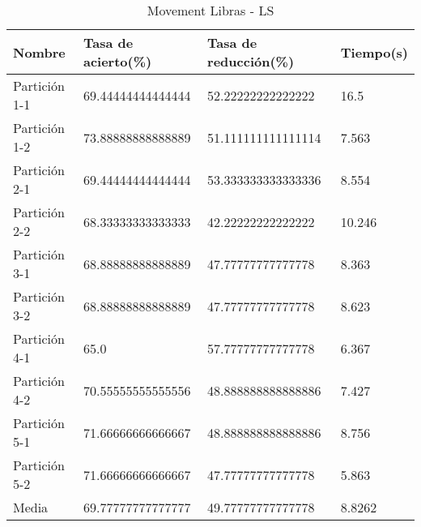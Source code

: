 \begin{table}[H]
	\centering
	\begin{tabular}{l|lll}
		Nombre        & Tasa de acierto(\%) & Tasa de reducción(\%) & Tiempo(s) \\ \hline
		Partición 1-1 & 69.44444444444444   & 52.22222222222222     & 16.5      \\
		Partición 1-2 & 73.88888888888889   & 51.111111111111114    & 7.563     \\
		Partición 2-1 & 69.44444444444444   & 53.333333333333336    & 8.554     \\
		Partición 2-2 & 68.33333333333333   & 42.22222222222222     & 10.246    \\
		Partición 3-1 & 68.88888888888889   & 47.77777777777778     & 8.363     \\
		Partición 3-2 & 68.88888888888889   & 47.77777777777778     & 8.623     \\
		Partición 4-1 & 65.0                & 57.77777777777778     & 6.367     \\
		Partición 4-2 & 70.55555555555556   & 48.888888888888886    & 7.427     \\
		Partición 5-1 & 71.66666666666667   & 48.888888888888886    & 8.756     \\
		Partición 5-2 & 71.66666666666667   & 47.77777777777778     & 5.863     \\ \hline
		Media         & 69.77777777777777   & 49.77777777777778     & 8.8262   
	\end{tabular}
	\caption{Movement Libras - LS}
	\label{MLIB-LS}
\end{table}